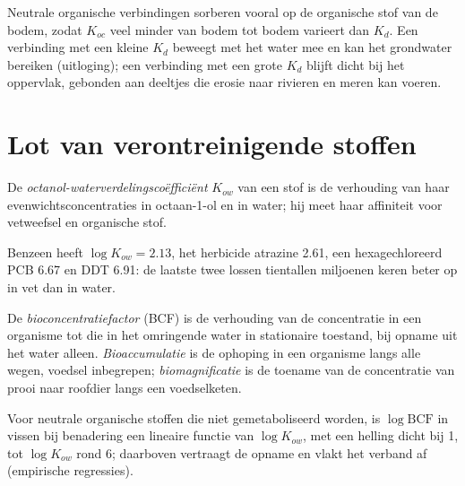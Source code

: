 Neutrale organische verbindingen sorberen vooral op de organische stof
van de bodem, zodat $K_{oc}$ veel minder van bodem tot bodem varieert dan $K_d$. Een verbinding met een kleine $K_d$ beweegt met het water
mee en kan het grondwater bereiken (uitloging); een verbinding met een grote $K_d$ blijft dicht bij het oppervlak,
gebonden aan deeltjes die erosie naar rivieren en meren kan voeren.

\section{Lot van verontreinigende stoffen}

\begin{definition}\label{def:b3:environmental-toxicology:kow}
De \emph{octanol-waterverdelingscoëfficiënt}
$K_{ow}$ van een stof is de verhouding van haar evenwichtsconcentraties in
octaan-1-ol en in water; hij meet haar affiniteit voor vetweefsel en
organische stof.
\end{definition}

Benzeen heeft $\log K_{ow} = 2.13$, het herbicide atrazine 2.61, een hexagechloreerd PCB 6.67 en
DDT 6.91: de laatste twee lossen tientallen miljoenen keren beter op in
vet dan in water.

\begin{definition}[Bioaccumulatie]\label{def:b3:environmental-toxicology:bio}
De \emph{bioconcentratiefactor} (BCF) is de
verhouding van de concentratie in een organisme tot die in het omringende
water in stationaire toestand, bij opname uit het water alleen.
\emph{Bioaccumulatie} is de ophoping in een
organisme langs alle wegen, voedsel inbegrepen;
\emph{biomagnificatie} is de toename van de
concentratie van prooi naar roofdier langs een voedselketen.
\end{definition}

\begin{proposition}[BCF en $K_{ow}$]\label{prop:b3:environmental-toxicology:bcf-kow}
Voor neutrale organische stoffen die niet gemetaboliseerd worden, is $\log\mathrm{BCF}$ in vissen
bij benadering een lineaire functie van $\log K_{ow}$, met een helling dicht bij 1, tot $\log K_{ow}$ rond 6;
daarboven vertraagt de opname en vlakt het verband af (empirische
regressies).
\admitted
\end{proposition}

